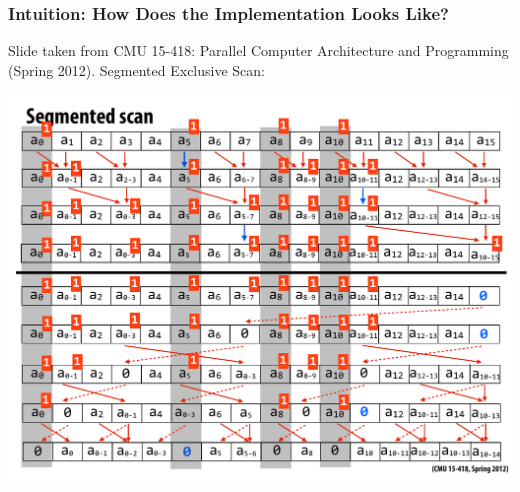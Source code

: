 \documentclass{beamer}
\begin{document}
\begin{frame}[fragile,t]
  \frametitle{Intuition: How Does the Implementation Looks Like?}

Slide taken from CMU 15-418: Parallel Computer Architecture and Programming (Spring 2012).
Segmented Exclusive Scan:\vspace{-2ex}

\begin{center}
\includegraphics[height=42ex]{img/day3/SgmExcScanFig} 
\end  {center}
\end{frame}
\end{document}
